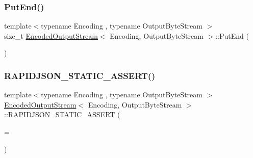 \mbox{\label{classEncodedOutputStream_a818695f6d3fa8896e9d7d0fbdc7d4514}} 
\subsubsection{\texorpdfstring{Put\+End()}{PutEnd()}}
{\footnotesize\ttfamily template$<$typename Encoding , typename Output\+Byte\+Stream $>$ \\
size\+\_\+t \hyperlink{classEncodedOutputStream}{Encoded\+Output\+Stream}$<$ Encoding, Output\+Byte\+Stream $>$\+::Put\+End (\begin{DoxyParamCaption}\item[{\hyperlink{classEncodedOutputStream_aa8f494d7ee2808307fbc9cd658c0f760}{Ch} $\ast$}]{ }\end{DoxyParamCaption})\hspace{0.3cm}{\ttfamily [inline]}}

\mbox{\label{classEncodedOutputStream_a108d370af476c4c5cbc1eeeb7a171d1e}} 
\subsubsection{\texorpdfstring{R\+A\+P\+I\+D\+J\+S\+O\+N\+\_\+\+S\+T\+A\+T\+I\+C\+\_\+\+A\+S\+S\+E\+R\+T()}{RAPIDJSON\_STATIC\_ASSERT()}}
{\footnotesize\ttfamily template$<$typename Encoding , typename Output\+Byte\+Stream $>$ \\
\hyperlink{classEncodedOutputStream}{Encoded\+Output\+Stream}$<$ Encoding, Output\+Byte\+Stream $>$\+::R\+A\+P\+I\+D\+J\+S\+O\+N\+\_\+\+S\+T\+A\+T\+I\+C\+\_\+\+A\+S\+S\+E\+RT (\begin{DoxyParamCaption}\item[{sizeof(typename Output\+Byte\+Stream\+::\+Ch)}]{ = {} }\end{DoxyParamCaption})\hspace{0.3cm}{\ttfamily [private]}}

